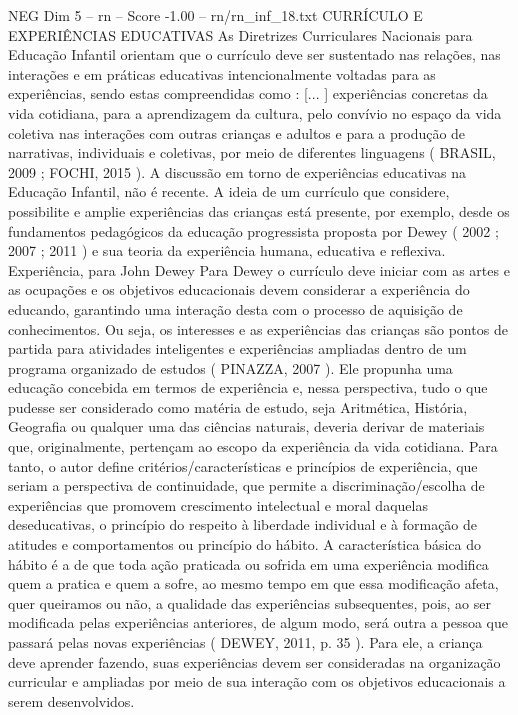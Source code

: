 \begin{textsample}{NEG Dim 5 – rn – Score -1.00 – rn/rn\_inf\_18.txt}  \label{ex:f5_neg_142}
CURRÍCULO E EXPERIÊNCIAS EDUCATIVAS As Diretrizes Curriculares Nacionais para Educação Infantil orientam que o currículo deve ser sustentado nas relações, nas interações e em práticas educativas intencionalmente voltadas para as experiências, sendo estas compreendidas como : [... ] experiências concretas da vida cotidiana, para a aprendizagem da cultura, pelo convívio no espaço da vida coletiva nas interações com outras crianças e adultos e para a produção de narrativas, individuais e coletivas, por meio de diferentes linguagens ( BRASIL, 2009 ; FOCHI, 2015 ).
A discussão em torno de experiências educativas na Educação Infantil, não é recente.
A ideia de um currículo que considere, possibilite e amplie experiências das crianças está presente, por exemplo, desde os fundamentos pedagógicos da educação progressista proposta por Dewey ( 2002 ; 2007 ; 2011 ) e sua teoria da experiência humana, educativa e reflexiva.
Experiência, para John Dewey Para Dewey o currículo deve iniciar com as artes e as ocupações e os objetivos educacionais devem considerar a experiência do educando, garantindo uma interação desta com o processo de aquisição de conhecimentos.
Ou seja, os interesses e as experiências das crianças são pontos de partida para atividades inteligentes e experiências ampliadas dentro de um programa organizado de estudos ( PINAZZA, 2007 ).
Ele propunha uma educação concebida em termos de experiência e, nessa perspectiva, tudo o que pudesse ser considerado como matéria de estudo, seja Aritmética, História, Geografia ou qualquer uma das ciências naturais, deveria derivar de materiais que, originalmente, pertençam ao escopo da experiência da vida cotidiana.
Para tanto, o autor define critérios/características e princípios de experiência, que seriam a perspectiva de continuidade, que permite a discriminação/escolha de experiências que promovem crescimento intelectual e moral daquelas deseducativas, o princípio do respeito à liberdade individual e à formação de atitudes e comportamentos ou princípio do hábito.
A característica básica do hábito é a de que toda ação praticada ou sofrida em uma experiência modifica quem a pratica e quem a sofre, ao mesmo tempo em que essa modificação afeta, quer queiramos ou não, a qualidade das experiências subsequentes, pois, ao ser modificada pelas experiências anteriores, de algum modo, será outra a pessoa que passará pelas novas experiências ( DEWEY, 2011, p. 35 ).
Para ele, a criança deve aprender fazendo, suas experiências devem ser consideradas na organização curricular e ampliadas por meio de sua interação com os objetivos educacionais a serem desenvolvidos.

\end{textsample}
